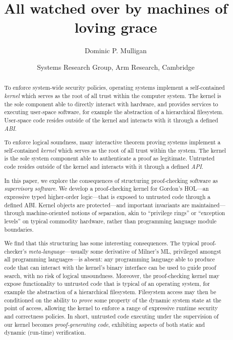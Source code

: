 \documentclass[a4paper, 10pt]{article}
\title{All watched over by machines of loving grace}
\author{Dominic P. Mulligan}
\date{Systems Research Group, Arm Research, Cambridge}
\begin{document}
\maketitle

\begin{abstract}
To enforce system-wide security policies, operating systems implement a self-contained \emph{kernel} which serves as the root of all trust within the computer system.
The kernel is the sole component able to directly interact with hardware, and provides services to executing user-space software, for example the abstraction of a hierarchical filesystem.
User-space code resides outside of the kernel and interacts with it through a defined \emph{ABI}.

To enforce logical soundness, many interactive theorem proving systems implement a self-contained \emph{kernel} which serves as the root of all trust within the system.
The kernel is the sole system component able to authenticate a proof as legitimate.
Untrusted code resides outside of the kernel and interacts with it through a defined \emph{API}.

In this paper, we explore the consequences of structuring proof-checking software as \emph{supervisory software}.
We develop a proof-checking kernel for Gordon's HOL---an expressive typed higher-order logic---that is exposed to untrusted code through a defined ABI.
Kernel objects are protected---and important invariants are maintained---through machine-oriented notions of separation, akin to ``privilege rings'' or ``exception levels'' on typical commodity hardware, rather than programming language module boundaries.

We find that this structuring has some interesting consequences.
The typical proof-checker's \emph{meta-language}---usually some derivative of Milner's ML, privileged amongst all programming languages---is absent: any programming language able to produce code that can interact with the kernel's binary interface can be used to guide proof search, with no risk of logical unsoundness.
Moreover, the proof-checking kernel may expose functionality to untrusted code that is typical of an operating system, for example the abstraction of a hierarchical filesystem.
Filesystem access may then be conditioned on the ability to \emph{prove} some property of the dynamic system state at the point of access, allowing the kernel to enforce a range of expressive runtime security and correctness policies.
In short, untrusted code executing under the supervision of our kernel becomes \emph{proof-generating code}, exhibiting aspects of both static and dynamic (run-time) verification.

\end{abstract}
\end{document}
